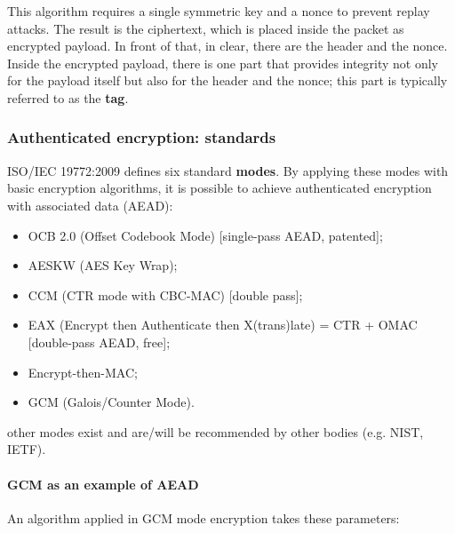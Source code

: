 This algorithm requires a single symmetric key and a nonce to prevent replay attacks. The result is the ciphertext, which is placed inside the packet as encrypted payload. In front of that, in clear, there are the header and the nonce. Inside the encrypted payload, there is one part that provides integrity not only for the payload itself but also for the header and the nonce; this part is typically referred to as the \textbf{tag}.


\subsubsection{Authenticated encryption: standards}
ISO/IEC 19772:2009 defines six standard \textbf{modes}. By applying these modes with basic encryption algorithms, it is possible to achieve authenticated encryption with associated data (AEAD):

\begin{itemize}
    \item OCB 2.0 (Offset Codebook Mode) [single-pass AEAD, patented];
    \item AESKW (AES Key Wrap);
    \item CCM (CTR mode with CBC-MAC) [double pass];
    \item EAX (Encrypt then Authenticate then X(trans)late) = CTR + OMAC [double-pass AEAD, free];
    \item Encrypt-then-MAC;
    \item GCM (Galois/Counter Mode).
\end{itemize}
other modes exist and are/will be recommended by other bodies (e.g. NIST, IETF).


\paragraph*{GCM as an example of AEAD}

An algorithm applied in GCM mode encryption takes these parameters:

